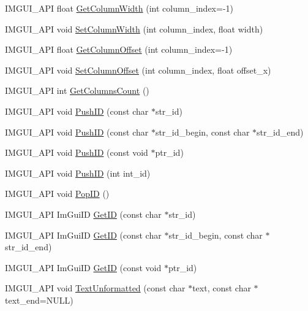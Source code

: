 \begin{DoxyCompactItemize}
\item 
I\+M\+G\+U\+I\+\_\+\+A\+PI float \hyperlink{namespace_im_gui_a3d205d86dab5ca0763a92997283ac36e}{Get\+Column\+Width} (int column\+\_\+index=-\/1)
\item 
I\+M\+G\+U\+I\+\_\+\+A\+PI void \hyperlink{namespace_im_gui_af17222ec47aebb5ede00be7b52de9f5d}{Set\+Column\+Width} (int column\+\_\+index, float width)
\item 
I\+M\+G\+U\+I\+\_\+\+A\+PI float \hyperlink{namespace_im_gui_a79c22e9c5c208b6c9534a273be71a9e6}{Get\+Column\+Offset} (int column\+\_\+index=-\/1)
\item 
I\+M\+G\+U\+I\+\_\+\+A\+PI void \hyperlink{namespace_im_gui_a8cc207211d6cf3f77b505e24aed4ebcc}{Set\+Column\+Offset} (int column\+\_\+index, float offset\+\_\+x)
\item 
I\+M\+G\+U\+I\+\_\+\+A\+PI int \hyperlink{namespace_im_gui_a3c2998ad9527948a4e4166c4f7db9ec9}{Get\+Columns\+Count} ()
\item 
I\+M\+G\+U\+I\+\_\+\+A\+PI void \hyperlink{namespace_im_gui_a27a8533605dc5b8cabf161bf7715bbde}{Push\+ID} (const char $\ast$str\+\_\+id)
\item 
I\+M\+G\+U\+I\+\_\+\+A\+PI void \hyperlink{namespace_im_gui_af5e55788830807a7c53d5dd7865b692a}{Push\+ID} (const char $\ast$str\+\_\+id\+\_\+begin, const char $\ast$str\+\_\+id\+\_\+end)
\item 
I\+M\+G\+U\+I\+\_\+\+A\+PI void \hyperlink{namespace_im_gui_af9cf42fdf2fbc5eeec7521de14996bfb}{Push\+ID} (const void $\ast$ptr\+\_\+id)
\item 
I\+M\+G\+U\+I\+\_\+\+A\+PI void \hyperlink{namespace_im_gui_a6a11664be2a0b9a0e7054bb339e009ac}{Push\+ID} (int int\+\_\+id)
\item 
I\+M\+G\+U\+I\+\_\+\+A\+PI void \hyperlink{namespace_im_gui_aba0b2d8f890a5d435ae43d0c4a2d4dd1}{Pop\+ID} ()
\item 
I\+M\+G\+U\+I\+\_\+\+A\+PI Im\+Gui\+ID \hyperlink{namespace_im_gui_a3329b04bd4235e90ad9deb00ffb38ae4}{Get\+ID} (const char $\ast$str\+\_\+id)
\item 
I\+M\+G\+U\+I\+\_\+\+A\+PI Im\+Gui\+ID \hyperlink{namespace_im_gui_a26064d74efebef3aa86e1a78b3e4c333}{Get\+ID} (const char $\ast$str\+\_\+id\+\_\+begin, const char $\ast$str\+\_\+id\+\_\+end)
\item 
I\+M\+G\+U\+I\+\_\+\+A\+PI Im\+Gui\+ID \hyperlink{namespace_im_gui_a220123ad62c2180ded92b2ef91f27c5a}{Get\+ID} (const void $\ast$ptr\+\_\+id)
\item 
I\+M\+G\+U\+I\+\_\+\+A\+PI void \hyperlink{namespace_im_gui_a96a5f42789ecc419b2ae8af7b2acc28e}{Text\+Unformatted} (const char $\ast$text, const char $\ast$text\+\_\+end=N\+U\+LL)

\end{DoxyCompactItemize}
